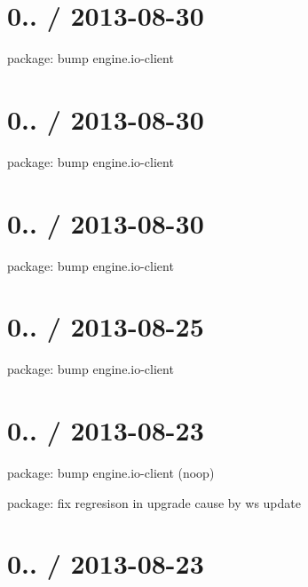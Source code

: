 \section*{0.. / 2013-\/08-\/30 }


\begin{DoxyItemize}
\item package\+: bump {\ttfamily engine.\+io-\/client}
\end{DoxyItemize}

\section*{0.. / 2013-\/08-\/30 }


\begin{DoxyItemize}
\item package\+: bump engine.\+io-\/client
\end{DoxyItemize}

\section*{0.. / 2013-\/08-\/30 }


\begin{DoxyItemize}
\item package\+: bump engine.\+io-\/client
\end{DoxyItemize}

\section*{0.. / 2013-\/08-\/25 }


\begin{DoxyItemize}
\item package\+: bump {\ttfamily engine.\+io-\/client}
\end{DoxyItemize}

\section*{0.. / 2013-\/08-\/23 }


\begin{DoxyItemize}
\item package\+: bump engine.\+io-\/client (noop)
\item package\+: fix regresison in upgrade cause by ws update
\end{DoxyItemize}

\section*{0.. / 2013-\/08-\/23 }


